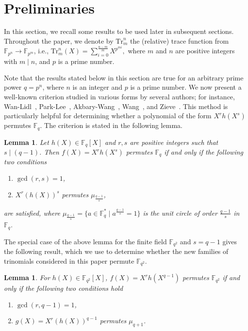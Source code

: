 \documentclass[12pt,reqno]{amsart}
\newtheorem{lem}[thm]{Lemma}
\numberwithin{equation}{section}
\theoremstyle{definition}
\newcommand{\F}{\mathbb F}
\begin{document}
\section{Preliminaries}\label{S2}
In this section, we recall some results to be used later in subsequent sections. Throughout the paper, we denote by 
$\mbox{Tr}_m^n$ the (relative) trace function from $\F_{p^n} \rightarrow \F_{p^m}$, i.e., $ \mbox{Tr}_m^
n(X)=\sum^{\frac{n-m}{m}}_{i=0}X^{p^{mi}},$ where $m$ and $n$ are positive integers with $m \mid n$, and $p$ is a prime number.


Note that the results stated below in this section are true for an arbitrary prime power $q = p^n$, where $n$ is an integer and $p$ is a prime number. We now present a well-known criterion studied in various forms by several authors; for instance, Wan-Lidl~\cite{Wan}, Park-Lee~\cite{Park}, Akbary-Wang~\cite{AW2007}, Wang~\cite{Wang}, and Zieve~\cite{Zieve}. This method is particularly helpful for determining whether a polynomial of the form $X^r h(X^{s})$ permutes $\F_{q}$. 
The criterion is stated in the following lemma.
\begin{lem}
Let $h(X)\in \F_{q}[X]$ and $r, s$ are positive integers such that $s\mid (q-1)$. Then $f(X)=X^r h(X^{s})$ permutes $\F_{q}$ if and only if the following two conditions
\begin{enumerate}
\item $\gcd(r, s) = 1$,
\item $ X^r ({ h(X) })^{s}$ permutes $\mu_{\frac{q-1}{s}}$,
\end{enumerate}
 are satisfied, where $\mu_{\frac{q-1}{s}}=\{a\in \F_{q}^{*} \mid a^{\frac{q-1}{s}}=1\}$ is the unit circle of order $\frac{q-1}{s}$ in $\F_{q}$.
\end{lem}

The special case of the above lemma for the finite field $\F_{q^2}$ and $s=q-1$ gives the following result, which we use to determine whether the new families of trinomials considered in this paper permute $\F_{q^2}$.

\begin{lem}\label{PP}
For $h(X) \in \F_{q^2} [X]$, $f(X) = X^r h(X^{q-1})$ permutes $\F_{q^2}$ if and only if the following two conditions hold
\begin{enumerate}
\item $\gcd(r, q - 1) = 1$,
\item $g(X) = X^r(h(X))^{q-1}$ permutes $\mu_{q+1}$.
\end{enumerate}
\end{lem} 
\end{document}
